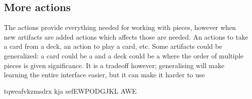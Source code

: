 \subsection{More actions}
\label{sec:moreactions}

The actions provide everything needed for working with pieces, however when new artifacts are added actions which affects those are needed. An actions to take a card from a deck, an action to play a card, etc. Some artifacts could be generalized: a card could be a  and a deck could be a  where the order of multiple pieces is given significance. It is a tradeoff however; generalising will make learning the entire interface easier, but it can make it harder to use


tqweafvkzmsdrx kja sefEWPODGJKL AWE